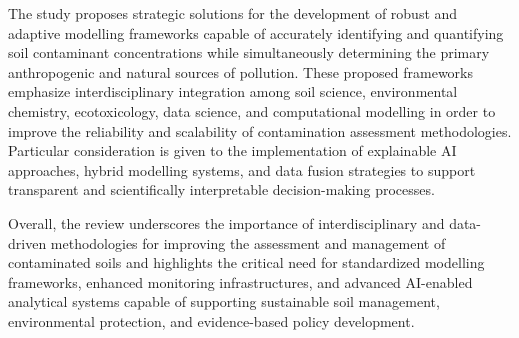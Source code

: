 \documentclass[land,article,submit,pdftex,moreauthors]{Definitions/mdpi}
\begin{document}
The study proposes strategic solutions for the development of robust and
adaptive modelling frameworks capable of accurately identifying and quantifying
soil contaminant concentrations while simultaneously determining the primary
anthropogenic and natural sources of pollution. These proposed frameworks
emphasize interdisciplinary integration among soil science, environmental
chemistry, ecotoxicology, data science, and computational modelling in order
to improve the reliability and scalability of contamination assessment
methodologies. Particular consideration is given to the implementation of
explainable AI approaches, hybrid modelling systems, and data fusion strategies
to support transparent and scientifically interpretable decision-making
processes.

Overall, the review underscores the importance of interdisciplinary and
data-driven methodologies for improving the assessment and management of
contaminated soils and highlights the critical need for standardized modelling
frameworks, enhanced monitoring infrastructures, and advanced AI-enabled
analytical systems capable of supporting sustainable soil management,
environmental protection, and evidence-based policy development.








\end{document}
